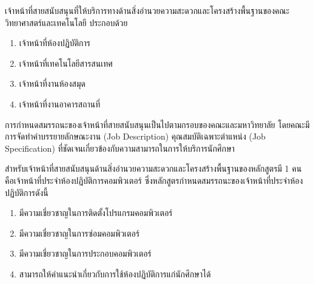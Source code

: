 \begin{doclist}
\end{doclist}

เจ้าหน้าที่สายสนับสนุนที่ให้บริการทางด้านสิ่งอำนวยความสะดวกและโครงสร้างพื้นฐานของคณะวิทยาศาสตร์และเทคโนโลยี ประกอบด้วย
\begin{enumerate}
	\item เจ้าหน้าที่ห้องปฏิบัติการ
	\item เจ้าหน้าที่เทคโนโลยีสารสนเทศ
	\item เจ้าหน้าที่งานห้องสมุด
	\item เจ้าหน้าที่งานอาคารสถานที่
\end{enumerate}

การกำหนดสมรรถนะของเจ้าหน้าที่สายสนับสนุนเป็นไปตามกรอบของคณะและมหาวิทยาลัย  โดยคณะมีการจัดทำคำบรรยายลักษณะงาน  (Job Description) คุณสมบัติเฉพาะตำแหน่ง  (Job Specification) ที่ชัดเจนเกี่ยวข้องกับความสามารถในการให้บริการนักศึกษา

สำหรับเจ้าหน้าที่สายสนับสนุนด้านสิ่งอำนวยความสะดวกและโครงสร้างพื้นฐานของหลักสูตรมี 1 คน
คือเจ้าหน้าที่ประจำห้องปฏิบัติการคอมพิวเตอร์ ซึ่งหลักสูตรกำหนดสมรรถนะของเจ้าหน้าที่ประจำห้องปฏิบัติการดังนี้
\begin{enumerate}
	\item มีความเชี่ยวชาญในการติดตั้งโปรแกรมคอมพิวเตอร์
	\item มีความเชี่ยวชาญในการซ่อมคอมพิวเตอร์
	\item มีความเชี่ยวชาญในการประกอบคอมพิวเตอร์
	\item สามารถให้คำแนะนำเกี่ยวกับการใช้ห้องปฏิบัติการแก่นักศึกษาได้
\end{enumerate}

